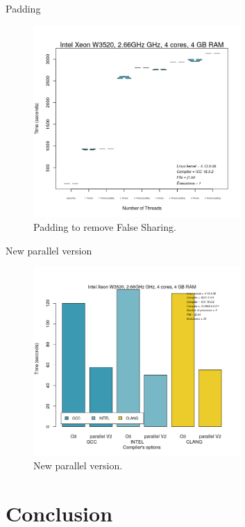 \documentclass{beamer}
\begin{document}
\begin{frame}{Padding}
	\begin{figure}
      \includegraphics[width=0.7\textwidth]{padding.png}
      \caption{Padding to remove False Sharing.\label{Fig:trie}}
	\end{figure}
\end{frame}

\begin{frame}{New parallel version}
	\begin{figure}
      \includegraphics[width=0.7\textwidth]{parallel_v2.png}
      \caption{New parallel version.\label{Fig:trie}}
	\end{figure}
\end{frame}

\section{Conclusion}
\end{document}
